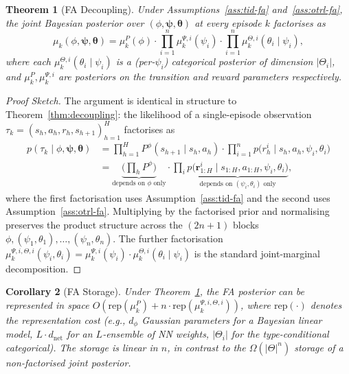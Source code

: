 \documentclass{article}
\newtheorem{theorem}{Theorem}[section]
\newtheorem{corollary}[theorem]{Corollary}
\begin{document}
\begin{theorem}[FA Decoupling]
\label{thm:fa-decoupling}
Under Assumptions~\ref{ass:tid-fa} and~\ref{ass:otrl-fa}, the joint Bayesian posterior over $(\phi, \boldsymbol{\psi}, \boldsymbol{\theta})$ at every episode $k$ factorises as
\begin{equation}
\mu_k(\phi, \boldsymbol{\psi}, \boldsymbol{\theta}) = \mu_k^P(\phi) \cdot \prod_{i=1}^n \mu_k^{\Psi, i}(\psi_i) \cdot \prod_{i=1}^n \mu_k^{\Theta, i}(\theta_i \mid \psi_i),
\end{equation}
where each $\mu_k^{\Theta, i}(\theta_i \mid \psi_i)$ is a (per-$\psi_i$) categorical posterior of dimension $|\Theta_i|$, and $\mu_k^P, \mu_k^{\Psi, i}$ are posteriors on the transition and reward parameters respectively.
\end{theorem}

\begin{proof}[Proof Sketch]
The argument is identical in structure to Theorem~\ref{thm:decoupling}: the likelihood of a single-episode observation $\tau_k = (s_h, a_h, r_h, s_{h+1})_{h=1}^H$ factorises as
\begin{align}
p(\tau_k \mid \phi, \boldsymbol{\psi}, \boldsymbol{\theta}) &= \prod_{h=1}^H P^\phi(s_{h+1} \mid s_h, a_h) \cdot \prod_{i=1}^n p\big(r_h^i \mid s_h, a_h, \psi_i, \theta_i\big) \\
&= \underbrace{\Big(\prod_h P^\phi\big)}_{\text{depends on } \phi \text{ only}} \cdot \prod_i \underbrace{p\big(\boldsymbol{r}^i_{1:H} \mid s_{1:H}, a_{1:H}, \psi_i, \theta_i\big)}_{\text{depends on } (\psi_i, \theta_i) \text{ only}},
\end{align}
where the first factorisation uses Assumption~\ref{ass:tid-fa} and the second uses Assumption~\ref{ass:otrl-fa}. Multiplying by the factorised prior and normalising preserves the product structure across the $(2n+1)$ blocks $\phi, (\psi_1, \theta_1), \ldots, (\psi_n, \theta_n)$. The further factorisation $\mu_k^{\Psi, i, \Theta, i}(\psi_i, \theta_i) = \mu_k^{\Psi, i}(\psi_i) \cdot \mu_k^{\Theta, i}(\theta_i \mid \psi_i)$ is the standard joint-marginal decomposition.
\end{proof}

\begin{corollary}[FA Storage]
\label{cor:fa-storage}
Under Theorem~\ref{thm:fa-decoupling}, the FA posterior can be represented in space $O(\mathrm{rep}(\mu_k^P) + n \cdot \mathrm{rep}(\mu_k^{\Psi, i, \Theta, i}))$, where $\mathrm{rep}(\cdot)$ denotes the representation cost (e.g., $d_\phi$ Gaussian parameters for a Bayesian linear model, $L \cdot d_{\mathrm{net}}$ for an $L$-ensemble of NN weights, $|\Theta_i|$ for the type-conditional categorical). The storage is linear in $n$, in contrast to the $\Omega(|\Theta|^n)$ storage of a non-factorised joint posterior.
\end{corollary}
\end{document}
